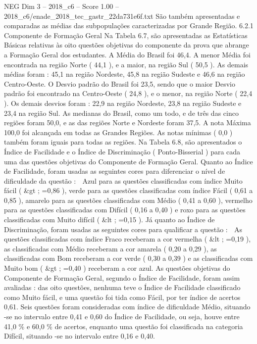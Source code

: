 \begin{textsample}{NEG Dim 3 – 2018\_c6 – Score 1.00 – 2018\_c6/enade\_2018\_tec\_gastr\_22da731e6f.txt}
São também apresentadas e comparadas as médias das subpopulações caracterizadas por Grande Região. 6.2.1 Componente de Formação Geral Na Tabela 6.7, são apresentadas as Estatísticas Básicas relativas às oito questões objetivas do componente da prova que abrange a Formação Geral dos estudantes.
A Média do Brasil foi 46,4.
A menor Média foi encontrada na região Norte ( 44,1 ), e a maior, na região Sul ( 50,5 ).
As demais médias foram : 45,1 na região Nordeste, 45,8 na região Sudeste e 46,6 na região Centro-Oeste.
O Desvio padrão do Brasil foi 23,5, sendo que o maior Desvio padrão foi encontrado na Centro-Oeste ( 24,8 ), e o menor, na região Norte ( 22,4 ).
Os demais desvios foram : 22,9 na região Nordeste, 23,8 na região Sudeste e 23,4 na região Sul.
As medianas do Brasil, como um todo, e de três das cinco regiões foram 50,0, e as das regiões Norte e Nordeste foram 37,5.
A nota Máxima 100,0 foi alcançada em todas as Grandes Regiões.
As notas mínimas ( 0,0 ) também foram iguais para todas as regiões.
Na Tabela 6.8, são apresentados o Índice de Facilidade e o Índice de Discriminação ( Ponto-Bisserial ) para cada uma das questões objetivas do Componente de Formação Geral.
Quanto ao Índice de Facilidade, foram usadas as seguintes cores para diferenciar o nível de dificuldade da questão :  Azul para as questões classificadas com índice Muito fácil ( \&gt ; =0,86 ), verde para as questões classificadas com índice Fácil ( 0,61 a 0,85 ), amarelo para as questões classificadas com Médio ( 0,41 a 0,60 ), vermelho para as questões classificadas com Difícil ( 0,16 a 0,40 ) e roxo para as questões classificadas com Muito difícil ( \&lt ; =0,15 ).
Já quanto ao Índice de Discriminação, foram usadas as seguintes cores para qualificar a questão :  As questões classificadas com índice Fraco receberam a cor vermelha ( \&lt ; =0,19 ), as classificadas com Médio receberam a cor amarela ( 0,20 a 0,29 ), as classificadas com Bom receberam a cor verde ( 0,30 a 0,39 ) e as classificadas com Muito bom ( \&gt ; =0,40 ) receberam a cor azul.
As questões objetivas do Componente de Formação Geral, segundo o Índice de Facilidade, foram assim avaliadas : das oito questões, nenhuma teve o Índice de Facilidade classificado como Muito fácil, e uma questão foi tida como Fácil, por ter índice de acertos 0,61.
Seis questões foram consideradas com índice de dificuldade Médio, situando -se no intervalo entre 0,41 e 0,60 do Índice de Facilidade, ou seja, houve entre 41,0 \% e 60,0 \% de acertos, enquanto uma questão foi classificada na categoria Difícil, situando -se no intervalo entre 0,16 e 0,40.

\end{textsample}
